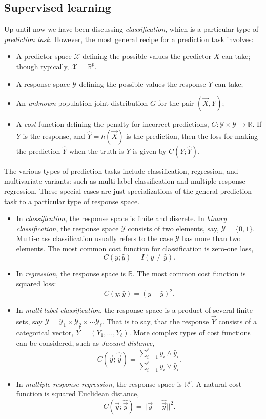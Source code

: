 \subsection{Supervised learning}

Up until now we have been discussing \emph{classification}, which is a
particular type of \emph{prediction task}.  However, the most general
recipe for a prediction task involves:

\begin{itemize}
\item A predictor space $\mathcal{X}$ defining the possible values the
  predictor $X$ can take; though typically, $\mathcal{X} =
  \mathbb{R}^p$.
\item A response space $\mathcal{Y}$ defining the possible values the response $Y$ can take;
\item An \emph{unknown} population joint distribution $G$ for the pair $(\vec{X}, Y)$;
\item A \emph{cost} function defining the penalty for incorrect
  predictions, $C: \mathcal{Y} \times \mathcal{Y} \to \mathbb{R}$.  If
  $Y$ is the response, and $\hat{Y} = h(\vec{X})$ is the prediction, then
  the loss for making the prediction $\hat{Y}$ when the truth is $Y$
  is given by $C(Y; \hat{Y})$.
\end{itemize}

The various types of prediction tasks include classification,
regression, and multivariate variants: such as multi-label
classification and multiple-response regression.  These special cases
are just specializations of the general prediction task to a
particular type of response space.

\begin{itemize}
\item In \emph{classification}, the response space is finite and
  discrete.  In \emph{binary classification}, the response space
  $\mathcal{Y}$ consists of two elements, say, $\mathcal{Y} = \{0,
  1\}$.  Multi-class classification usually refers to the case
  $\mathcal{Y}$ has more than two elements.  The most common cost
  function for classification is zero-one loss,
\[
C(y; \hat{y}) = I(y \neq \hat{y}).
\]
\item In \emph{regression}, the response space is $\mathbb{R}$.  The most common cost function is squared loss:
\[
C(y; \hat{y}) = (y - \hat{y})^2.
\]
\item In \emph{multi-label classification}, the response space is a
  product of several finite sets, say $\mathcal{Y} = \mathcal{Y}_1
  \times \mathcal{Y}_2 \times \cdots \mathcal{Y}_\ell$.  That is to
  say, that the response $\vec{Y}$ consists of a categorical vector,
  $\vec{Y} = (Y_1,\hdots, Y_\ell)$. More complex types of cost
  functions can be considered, such as \emph{Jaccard distance},
\[
C(\vec{y}; \hat{\vec{y}}) = \frac{\sum_{i=1}^\ell y_i \wedge \hat{y}_i}{\sum_{i=1}^\ell y_i \vee \hat{y}_i}.
\]
\item In \emph{multiple-response regression}, the response space is $\mathbb{R}^p$.  A natural cost function is squared Euclidean distance,
\[
C(\vec{y}; \hat{\vec{y}}) = ||\vec{y} - \hat{\vec{y}}||^2.
\]
\end{itemize}

